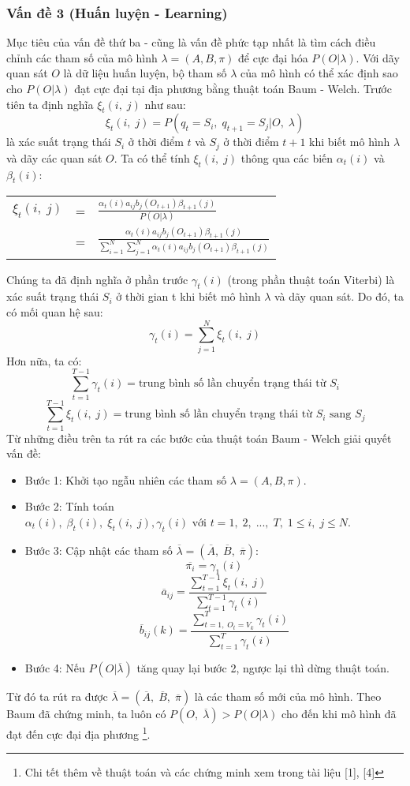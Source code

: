 \subsubsection{Vấn đề 3 (Huấn luyện - Learning)}
Mục tiêu của vấn đề thứ ba - cũng là vấn đề phức tạp nhất là tìm cách điều chỉnh các tham số của mô hình $\lambda=(A,B,\pi)$ để cực đại hóa $P(O|\lambda)$. Với dãy quan sát $O$ là dữ liệu huấn luyện, bộ tham số $\lambda$ của mô hình có thể xác định sao cho $P(O|\lambda)$ đạt cực đại tại địa phương bằng thuật toán Baum - Welch. Trước tiên ta định nghĩa $\xi_t(i,\; j)$ như sau:
$$\xi_t(i,\; j)=P(q_t=S_i,\; q_{t+1}=S_j|O,\; \lambda)$$
là xác suất trạng thái $S_i$ ở thời điểm $t$ và $S_j$ ở thời điểm $t+1$ khi biết mô hình $\lambda$ và dãy các quan sát $O$. Ta có thể tính $\xi_t(i,\; j)$ thông qua các biến $\alpha_t(i)$ và $\beta_t(i)$:
\begin{center}
	\begin{tabular}{lll}
		$\xi_t(i,\; j)$ & = & $\frac{\alpha_t(i)a_{ij}b_j(O_{t+1})\beta_{t+1}(j)}{P(O|\lambda)}$ \\ 
		& = & $\frac{\alpha_t(i)a_{ij}b_j(O_{t+1})\beta_{t+1}(j)}{\sum_{i=1}^{N}\sum_{j=1}^{N}\alpha_t(i)a_{ij}b_j(O_{t+1})\beta_{t+1}(j)}$ \\ 
	\end{tabular}
\end{center}
Chúng ta đã định nghĩa ở phần trước $\gamma_t(i)$ (trong phần thuật toán Viterbi) là xác suất trạng thái $S_i$ ở thời gian t khi biết mô hình $\lambda$ và dãy quan sát. Do đó, ta có mối quan hệ sau:
$$\gamma_t(i)=\sum_{j=1}^{N}\xi_t(i,\;j)$$
Hơn nữa, ta có:
$$\sum_{t=1}^{T-1}\gamma_t(i)=\text{trung bình số lần chuyển trạng thái từ } S_i$$
$$\sum_{t=1}^{T-1}\xi_t(i,\;j)=\text{trung bình số lần chuyển trạng thái từ } S_i \text{ sang } S_j$$
\newpage
Từ những điều trên ta rút ra các bước của thuật toán Baum - Welch giải quyết vấn đề:
\begin{itemize}
	\item Bước 1: Khởi tạo ngẫu nhiên các tham số $\lambda = (A,B,\pi)$.
	\item Bước 2: Tính toán $\alpha_t(i),\; \beta_t(i),\; \xi_t(i,\;j),\gamma_t(i) \text{ với } t = 1,\; 2,\; ...,\; T, \; 1 \leq i,\; j \leq N$.
	\item Bước 3: Cập nhật các tham số $\overline{\lambda} = (\overline{A},\; \overline{B},\; \overline{\pi})$:
	$$\overline{\pi_i} = \gamma_1(i)$$
	$$\overline{a}_{ij} = \frac{\sum_{t=1}^{T-1}\xi_t(i,\;j)}{\sum_{t=1}^{T-1}\gamma_t(i)}$$
	$$\overline{b}_{ij}(k) = \frac{\sum_{t=1,\; O_t=V_k}^{T}\gamma_t(i)}{\sum_{t=1}^{T}\gamma_t(i)}$$
	\item Bước 4: Nếu $P(O|\overline{\lambda})$ tăng quay lại bước 2, ngược lại thì dừng thuật toán.
\end{itemize}
Từ đó ta rút ra được $\overline{\lambda} = (\overline{A},\; \overline{B},\; \overline{\pi})$ là các tham số mới của mô hình. Theo Baum đã chứng minh, ta luôn có $P(O,\; \overline{\lambda}) > P(O|\lambda)$ cho đến khi mô hình đã đạt đến cực đại địa phương \footnote{Chi tết thêm về thuật toán và các chứng minh xem trong tài liệu [1], [4]}.

